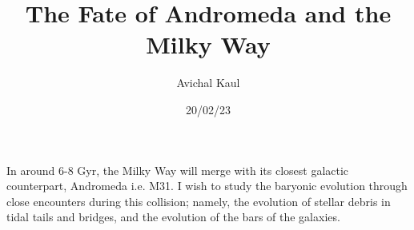 \documentclass{article}
\title{The Fate of Andromeda and the Milky Way}
\author{Avichal Kaul}
\date{20/02/23}
\begin{document}
  \maketitle
  In around 6-8 Gyr, the Milky Way will merge with its closest galactic counterpart, Andromeda i.e. M31. I wish to study the baryonic evolution through close encounters during this collision; namely, the evolution of stellar debris in tidal tails and bridges, and the evolution of the bars of the galaxies. 
\end{document}
